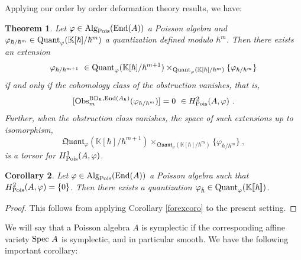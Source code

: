 \documentclass[11pt]{amsart}
\numberwithin{equation}{section}
\newtheorem{theo}{Theorem}[section]
\newtheorem{coro}[theo]{Corollary}
\theoremstyle{definition}
\newcommand{\bb}{\mathbb}
\newcommand{\OEnd}{{\textup{End}}}
\newcommand{\fph}{{[\![\hbar]\!]}}
\newcommand{\K}{{\bb K}}
\newcommand{\Obs}{{\textup{Obs}}}
\newcommand{\Spec}{{\textup{Spec\ }}}
\newcommand{\BDh}{{\textup{BD}_\hbar}}
\newcommand{\Quant}{{\textup{Quant}}}
\newcommand{\fQuant}{{\mathfrak{Quant}}}
\newcommand{\Alg}{{\textup{Alg}}}
\newcommand{\Pois}{{\textup{Pois}}}
\newcommand{\0}{{\textbf{0}}}
\begin{document}
\subsubsection{}
Applying our order by order deformation theory results, we have:
\begin{theo}\label{DefObsQuantThm} 
Let $\varphi\in \Alg_{\Pois}(\OEnd(A))$ a Poisson algebra and $\varphi_{\hbar/\hbar^{m}}\in\Quant_\varphi(\K[\hbar]/\hbar^{m}) $ a quantization defined modulo $\hbar^m$. Then there exists an extension
	\[ \varphi_{ \hbar / \hbar^{m+1}} \  \in \Quant_\varphi(\K[\hbar]/\hbar^{m+1}) \times_{\Quant_\varphi(\K[\hbar]/\hbar^{m}) } \{\varphi_{\hbar/\hbar^{m}} \}\]
	if and only if the cohomology class of the obstruction vanishes, that is,
	\[ [ \Obs^{\BDh,\OEnd(A_\hbar)}_m(\varphi_{\hbar/\hbar^{m}})]= 0 \ \in H^{2}_{\Pois}(A,\varphi) \ .\]
	Further, when the obstruction class vanishes, the space of such extensions up to isomorphism,
	\[  \fQuant_\varphi(\K[\hbar]/\hbar^{m+1}) \times_{\fQuant_\varphi(\K[\hbar]/\hbar^{m}) } \{\varphi_{\hbar/\hbar^{m}} \} \ , \]
	is a torsor for $H^{1}_{\Pois}(A,\varphi)$.
\end{theo}


\begin{coro} Let $\varphi\in \Alg_{\Pois}(\OEnd(A))$ a Poisson algebra such that $H^{2}_{\Pois}(A,\varphi)=\{0\}$. Then there exists a quantization $\varphi_{\hat{\hbar}}\in \Quant_\varphi(\K\fph)$.
\end{coro}
\begin{proof}
	This follows from applying Corollary \ref{forexcoro} to the present setting.
\end{proof}


We will say that a Poisson algebra $A$ is symplectic if the corresponding affine variety $\Spec A$ is symplectic, and in particular smooth. We have the following important corollary:
\end{document}
